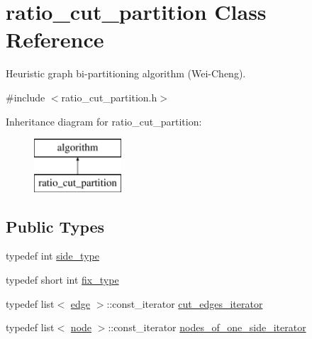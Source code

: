 \hypertarget{classratio__cut__partition}{}\section{ratio\+\_\+cut\+\_\+partition Class Reference}
\label{classratio__cut__partition}


Heuristic graph bi-\/partitioning algorithm (Wei-\/\+Cheng).  




{\ttfamily \#include $<$ratio\+\_\+cut\+\_\+partition.\+h$>$}

Inheritance diagram for ratio\+\_\+cut\+\_\+partition\+:\begin{figure}[H]
\begin{center}
\leavevmode
\includegraphics[height=2.000000cm]{classratio__cut__partition}
\end{center}
\end{figure}
\subsection*{Public Types}
\begin{DoxyCompactItemize}
\item 
typedef int \mbox{\hyperlink{classratio__cut__partition_ace53442bd0c1e21fbf00858ec6f6b456}{side\+\_\+type}}
\item 
typedef short int \mbox{\hyperlink{classratio__cut__partition_a558dda40abda8ab03edb4605dbb81e36}{fix\+\_\+type}}
\item 
typedef list$<$ \mbox{\hyperlink{classedge}{edge}} $>$\+::const\+\_\+iterator \mbox{\hyperlink{classratio__cut__partition_a5269af60e49810067411b085a1341adc}{cut\+\_\+edges\+\_\+iterator}}
\item 
typedef list$<$ \mbox{\hyperlink{classnode}{node}} $>$\+::const\+\_\+iterator \mbox{\hyperlink{classratio__cut__partition_a4f667099b56ded1bfef8f1fb4d09f81c}{nodes\+\_\+of\+\_\+one\+\_\+side\+\_\+iterator}}
\end{DoxyCompactItemize}
